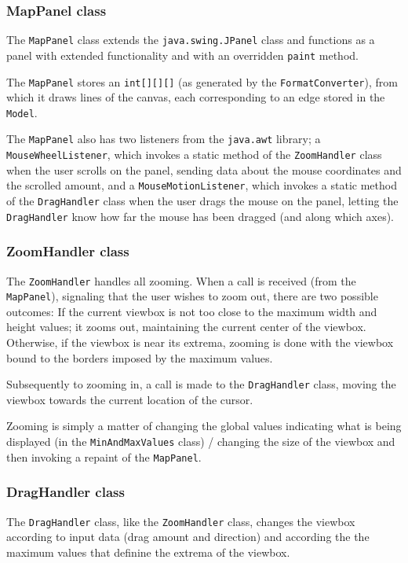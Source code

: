 \documentclass[a4paper,11pt]{article}
\begin{document}
\subsubsection{MapPanel class} %
The \texttt{MapPanel} class extends the \texttt{java.swing.JPanel} class and functions as a panel with extended functionality and with an overridden \texttt{paint} method.

The \texttt{MapPanel} stores an \texttt{int[][][]} (as generated by the \texttt{FormatConverter}), from which it draws lines of the canvas, each corresponding to an edge stored in the \texttt{Model}.

The \texttt{MapPanel} also has two listeners from the \texttt{java.awt} library; a \\\texttt{MouseWheelListener}, which invokes a static method of the \texttt{ZoomHandler} class when the user scrolls on the panel, sending data about the mouse coordinates and the scrolled amount, and a \texttt{MouseMotionListener}, which invokes a static method of the \texttt{DragHandler} class when the user drags the mouse on the panel, letting the \texttt{DragHandler} know how far the mouse has been dragged (and along which axes).

\subsubsection{ZoomHandler class} %
The \texttt{ZoomHandler} handles all zooming. When a call is received (from the \texttt{MapPanel}), signaling that the user wishes to zoom out, there are two possible outcomes: If the current viewbox is not too close to the maximum width and height values; it zooms out, maintaining the current center of the viewbox. Otherwise, if the viewbox is near its extrema, zooming is done with the viewbox bound to the borders imposed by the maximum values.

Subsequently to zooming in, a call is made to the \texttt{DragHandler} class, moving the viewbox towards the current location of the cursor.

Zooming is simply a matter of changing the global values indicating what is being displayed (in the \texttt{MinAndMaxValues} class) / changing the size of the viewbox and then invoking a repaint of the \texttt{MapPanel}.

\subsubsection{DragHandler class} %
The \texttt{DragHandler} class, like the \texttt{ZoomHandler} class, changes the viewbox according to input data (drag amount and direction) and according the the maximum values that definine the extrema of the viewbox.
\end{document}
